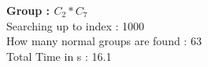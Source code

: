 \textbf{Group : $C_2*C_7$}\\
Searching up to index : 1000\\
How many normal groups are found : 63\\
Total Time in s : 16.1\\
